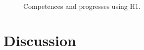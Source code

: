 \documentclass[conference]{include/IEEEtran}
\begin{document}
		\begin{figure}[!t]
			\centering
			\caption{Competences and progresses using H1.}
			\label{resH0}
		\end{figure}
	
%


\section{Discussion}

%


%
%
\end{document}
